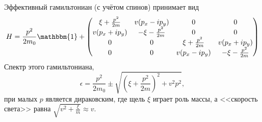Эффективный гамильтониан (с учётом спинов) принимает вид
\begin{equation}
    H = \frac{p^2}{2m_0}\mathbbm{1} + \begin{pmatrix}
            \xi + \frac{p^2}{2m} & v(p_x - ip_y) & 0 & 0 \\
            v(p_x + ip_y) & -\xi - \frac{p^2}{2m}& 0 & 0 \\
            0 & 0 & \xi + \frac{p^2}{2m} & v(p_x + ip_y) \\
            0 &  0 &  v(p_x - ip_y) & -\xi - \frac{p^2}{2m}
        \end{pmatrix}
\end{equation}
Спектр этого гамильтониана,
\begin{equation}
    \epsilon = \frac{p^2}{2m_0} \pm \sqrt{ \left(\xi + \frac{p^2}{2m}\right)^2 + v^2p^2  },
\end{equation}
при малых $p$ является дираковским, где щель $\xi$ играет роль массы, 
а <<скорость света>> равна
$\sqrt{v^2 + \frac{\xi}{m}} \approx v$.
